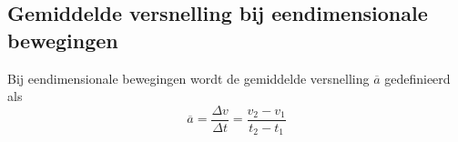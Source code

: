 \documentclass{ximera}
\begin{document}




\subsection*{Gemiddelde versnelling bij eendimensionale bewegingen}

\begin{definition}

Bij eendimensionale bewegingen wordt de gemiddelde versnelling \(\overline{a}\) gedefinieerd als
\[
\overline{a}=\frac{\Delta v}{\Delta t}=\frac{v_2-v_1}{t_2-t_1}
\]
\end{definition}

\end{document}
